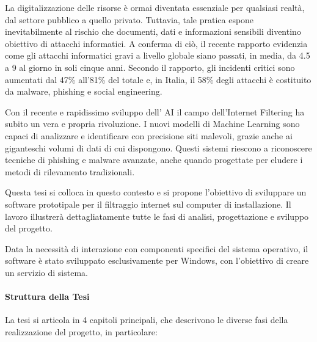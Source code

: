 \documentclass[12pt,a4paper,openright,twoside]{book}
\begin{document}
La digitalizzazione delle risorse è ormai diventata essenziale per qualsiasi realtà, dal settore pubblico a quello privato.
Tuttavia, tale pratica espone inevitabilmente al rischio che documenti,
dati e informazioni sensibili diventino obiettivo di attacchi informatici.
A conferma di ciò, il recente rapporto \cite{clusit2024-sicurezza} evidenzia come gli attacchi informatici gravi a livello globale siano passati,
in media, da 4.5 a 9 al giorno in soli cinque anni.
Secondo il rapporto, gli incidenti critici sono aumentati dal 47\% all'81\% del totale e,
in Italia, il 58\% degli attacchi è costituito da malware, phishing e social engineering.

Con il recente e rapidissimo sviluppo dell' \gls{AI} il campo dell'Internet Filtering ha subito un vera e propria rivoluzione.
I nuovi modelli di Machine Learning sono capaci di analizzare e identificare con precisione siti malevoli,
grazie anche ai giganteschi volumi di dati di cui dispongono.
Questi sistemi riescono a riconoscere tecniche di phishing e malware avanzate, anche quando progettate per eludere i metodi di rilevamento tradizionali.

Questa tesi si colloca in questo contesto e si propone l'obiettivo di sviluppare un software prototipale per il filtraggio internet sul computer di installazione.
Il lavoro illustrerà dettagliatamente tutte le fasi di analisi, progettazione e sviluppo del progetto.

Data la necessità di interazione con componenti specifici del sistema operativo,
il software è stato sviluppato esclusivamente per Windows, con l'obiettivo di creare un servizio di sistema.

\paragraph{Struttura della Tesi}

La tesi si articola in 4 capitoli principali, che descrivono le diverse fasi della realizzazione del progetto, in particolare:
\end{document}
